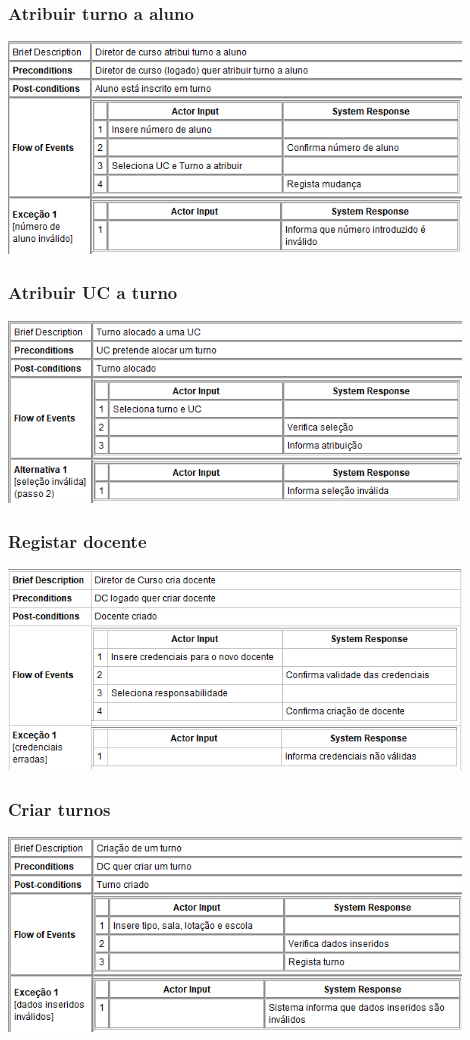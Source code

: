 \documentclass[a4paper]{article}
\begin{document}
\subsubsection{Atribuir turno a aluno}
\includegraphics[width=12cm]{atribuiturnoaluno}\break

\subsubsection{Atribuir UC a turno}
\includegraphics[width=12cm]{atribuiucaturno}\break

\subsubsection{Registar docente}
\includegraphics[width=12cm]{registardocente}\break

\subsubsection{Criar turnos}
\includegraphics[width=12cm]{criarturnos}\break
\end{document}
